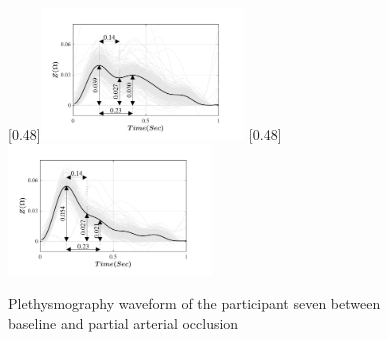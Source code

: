 \begin{figure}
	\centering
	\null\hfill%
	[0.48\textwidth]{\includegraphics[width=0.48\textwidth, trim={0.5cm 0cm 1.5cm 0 cm}, clip]{figure_apa_4a}}%
	\hfill%
	[0.48\textwidth]{\includegraphics[width=0.48\textwidth, trim={0.5cm 0cm 1.5cm 0 cm}, clip]{figure_apa_4b}}%
	\hfill\null%
	\caption{Plethysmography waveform of the participant seven between baseline and partial arterial occlusion}
	\label{fig:iPG arterial}

	\vspace{1cm}


\end{figure}
